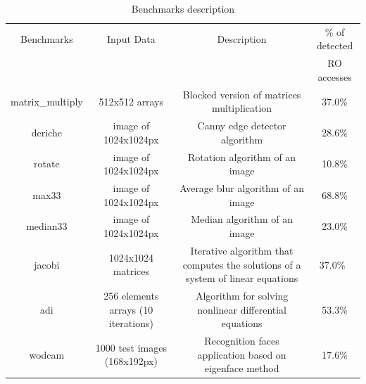 \documentclass[sigconf]{acmart}
\begin{document}
\begin{table}
\centering
\caption{Benchmarks description}
\label{benchs}
\begin{tabular}{ |c|c|c|c| }
\hline
\hline
  Benchmarks &  Input Data & Description &  \% of detected  \\
   &  &  &RO accesses \\
\hline
 matrix\_multiply & 512x512 arrays&  Blocked version of matrices multiplication& 37.0\%\\ 
\hline
 deriche & image of 1024x1024px& Canny edge detector algorithm& 28.6\%\\
\hline
 rotate & image of 1024x1024px &  Rotation algorithm of an image & 10.8\%\\
\hline
 max33 &  image of 1024x1024px & Average blur algorithm of an image& 68.8\%\\
\hline
 median33 &  image of 1024x1024px& Median algorithm of an image& 23.0\%\\
\hline
 jacobi & 1024x1024 matrices  &Iterative algorithm that computes the solutions of a system of linear equations & 37.0\%\ \\
\hline
 adi & 256 elements arrays (10 iterations) &  Algorithm for solving non\-linear differential equations & 53.3\%\\
\hline
 wodcam & 1000 test images (168x192px) &Recognition faces application based on eigenface method & 17.6\%\\
\hline
\hline
\end{tabular}
\end{table}

 
%
\end{document}
